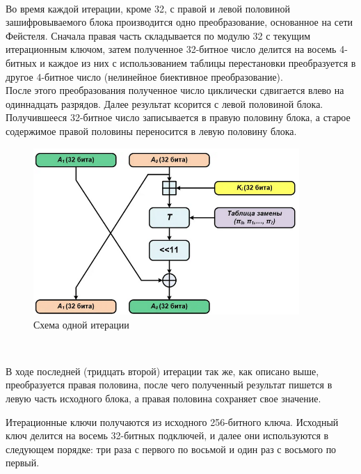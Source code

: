 \documentclass[oneside,final,14pt]{extreport}
\begin{document}
~\



Во время каждой итерации, кроме 32, с правой и левой половиной зашифровываемого блока производится одно преобразование, основанное на сети Фейстеля. Сначала правая часть складывается по модулю 32 с текущим итерационным ключом, затем полученное 32-битное число делится на восемь 4-битных и каждое из них с использованием таблицы перестановки преобразуется в другое 4-битное число (нелинейное биективное преобразование). \\

После этого преобразования полученное число циклически сдвигается влево на одиннадцать разрядов. Далее результат ксорится с левой половиной блока. Получившееся 32-битное число записывается в правую половину блока, а старое содержимое правой половины переносится в левую половину блока.\\

\begin{figure}[h!]
\includegraphics[width=0.9\textwidth]{3.png}
\caption{Схема одной итерации}

\end{figure}



~\




В ходе последней (тридцать второй) итерации так же, как описано выше, преобразуется правая половина, после чего полученный результат пишется в левую часть исходного блока, а правая половина сохраняет свое значение. 


Итерационные ключи получаются из исходного 256-битного ключа. Исходный ключ делится на восемь 32-битных подключей, и далее они используются в следующем порядке: три раза с первого по восьмой и один раз с восьмого по первый.\\
\end{document}
